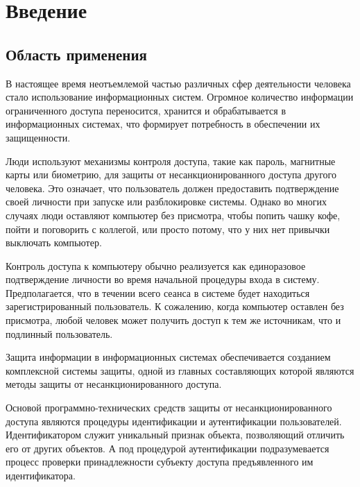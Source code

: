 \documentclass[12pt]{article}
\begin{document}
    \newpage



    \section{Введение}
    \label{sec:Intro}
    
    \subsection{Область применения}
    \label{sec:Intro:ApplicationArea}
    
    \par В настоящее время неотъемлемой частью различных сфер деятельности человека стало использование информационных систем. Огромное количество информации ограниченного доступа переносится, хранится и обрабатывается в информационных системах, что формирует потребность в обеспечении их защищенности. \\
    \par Люди используют механизмы контроля доступа, такие как пароль, магнитные карты или биометрию, для защиты от несанкционированного доступа другого человека. Это означает, что пользователь должен предоставить подтверждение своей личности при запуске или разблокировке системы. Однако во многих случаях люди оставляют компьютер без присмотра, чтобы попить чашку кофе, пойти и поговорить с коллегой, или просто потому, что у них нет привычки выключать компьютер. \\
    \par Контроль доступа к компьютеру обычно реализуется как единоразовое подтверждение личности во время начальной процедуры входа в систему. Предполагается, что в течении всего сеанса в системе будет находиться зарегистрированный пользователь. К сожалению, когда компьютер оставлен без присмотра, любой человек может получить доступ к тем же источникам, что и подлинный пользователь. \\
    \par Защита информации в информационных системах обеспечивается созданием комплексной системы защиты, одной из главных составляющих которой являются методы защиты от несанкционированного доступа. \\
    \par Основой программно-технических средств защиты от несанкционированного доступа являются процедуры идентификации и аутентификации пользователей. Идентификатором служит уникальный признак объекта, позволяющий отличить его от других объектов. А под процедурой аутентификации подразумевается процесс проверки принадлежности субъекту доступа предъявленного им идентификатора. \\
\end{document}
